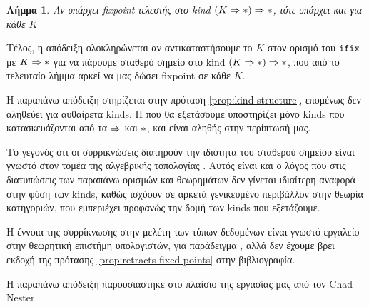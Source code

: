     \newtheorem{corollary}{Λήμμα} \begin{corollary} Αν υπάρχει fixpoint
    τελεστής στο kind $(K \Rightarrow \operatorname{\ast}) \Rightarrow \operatorname{\ast}$, τότε υπάρχει και
    για κάθε $K$ \end{corollary}


Τέλος, η απόδειξη ολοκληρώνεται αν αντικαταστήσουμε το $K$ στον ορισμό του
          $\operatorname{\texttt{ifix}}$ με $K \Rightarrow \operatorname{\ast}$ για να πάρουμε σταθερό σημείο στο
          kind $(K \Rightarrow \operatorname{\ast}) \Rightarrow \operatorname{\ast}$, που από το τελευταίο
          λήμμα αρκεί να μας δώσει fixpoint σε κάθε $K$.



Η παραπάνω απόδειξη στηρίζεται στην πρόταση \ref{prop:kind-structure}, επομένως
          δεν αληθεύει για αυθαίρετα kinds. Η \FOMF{} που θα εξετάσουμε
          υποστηρίζει μόνο kinds που κατασκευάζονται από τα $\Rightarrow$ και
          $\operatorname{\ast}$, και είναι αληθής στην περίπτωσή μας.

Το γεγονός ότι οι συρρικνώσεις διατηρούν την ιδιότητα του σταθερού σημείου
          είναι γνωστό στον τομέα της αλγεβρικής τοπολογίας
          \cite{eilenberg-steenrod}. Αυτός είναι και ο λόγος που στις
          διατυπώσεις των παραπάνω ορισμών και θεωρημάτων δεν γίνεται ιδιαίτερη
          αναφορά στην φύση των kinds, καθώς ισχύουν σε αρκετά γενικευμένο
          περιβάλλον στην θεωρία κατηγοριών, που εμπεριέχει προφανώς την δομή
          των kinds που εξετάζουμε.

Η έννοια της συρρίκνωσης στην μελέτη των τύπων δεδομένων είναι γνωστό εργαλείο
          στην θεωρητική επιστήμη υπολογιστών, για παράδειγμα \cite{stirling},
          αλλά δεν έχουμε βρει εκδοχή της πρότασης
          \ref{prop:retracts-fixed-points} στην βιβλιογραφία.

Η παραπάνω απόδειξη παρουσιάστηκε στο πλαίσιο της εργασίας μας από τον Chad
          Nester.

